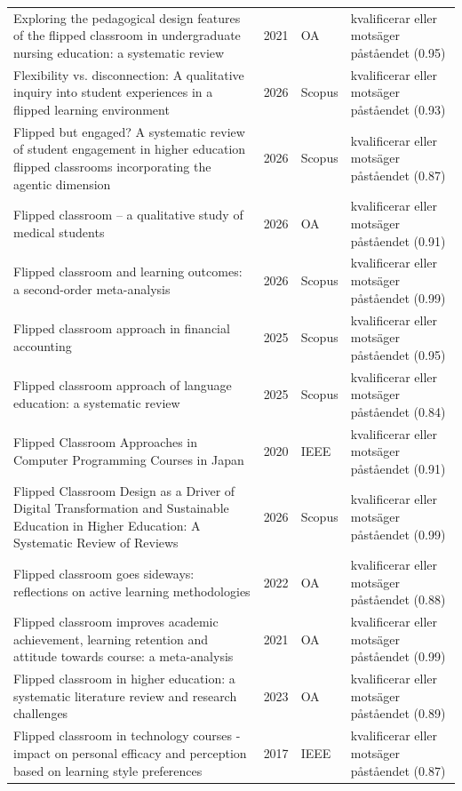 \begin{longtable}{@{}%
  >{\raggedright\arraybackslash}p{}c%
  >{\raggedright\arraybackslash}p{}%
  >{\raggedright\arraybackslash}p{}@{}}
Exploring the pedagogical design features of the flipped classroom in undergraduate nursing education: a systematic review & 2021 & OA & kvalificerar eller motsäger påståendet (0.95) \\
Flexibility vs. disconnection: A qualitative inquiry into student experiences in a flipped learning environment & 2026 & Scopus & kvalificerar eller motsäger påståendet (0.93) \\
Flipped but engaged? A systematic review of student engagement in higher education flipped classrooms incorporating the agentic dimension & 2026 & Scopus & kvalificerar eller motsäger påståendet (0.87) \\
Flipped classroom -- a qualitative study of medical students & 2026 & OA & kvalificerar eller motsäger påståendet (0.91) \\
Flipped classroom and learning outcomes: a second-order meta-analysis & 2026 & Scopus & kvalificerar eller motsäger påståendet (0.99) \\
Flipped classroom approach in financial accounting & 2025 & Scopus & kvalificerar eller motsäger påståendet (0.95) \\
Flipped classroom approach of language education: a systematic review & 2025 & Scopus & kvalificerar eller motsäger påståendet (0.84) \\
Flipped Classroom Approaches in Computer Programming Courses in Japan & 2020 & IEEE & kvalificerar eller motsäger påståendet (0.91) \\
Flipped Classroom Design as a Driver of Digital Transformation and Sustainable Education in Higher Education: A Systematic Review of Reviews & 2026 & Scopus & kvalificerar eller motsäger påståendet (0.99) \\
Flipped classroom goes sideways: reflections on active learning methodologies & 2022 & OA & kvalificerar eller motsäger påståendet (0.88) \\
Flipped classroom improves academic achievement, learning retention and attitude towards course: a meta-analysis & 2021 & OA & kvalificerar eller motsäger påståendet (0.99) \\
Flipped classroom in higher education: a systematic literature review and research challenges & 2023 & OA & kvalificerar eller motsäger påståendet (0.89) \\
Flipped classroom in technology courses - impact on personal efficacy and perception based on learning style preferences & 2017 & IEEE & kvalificerar eller motsäger påståendet (0.87) \\

\end{longtable}
